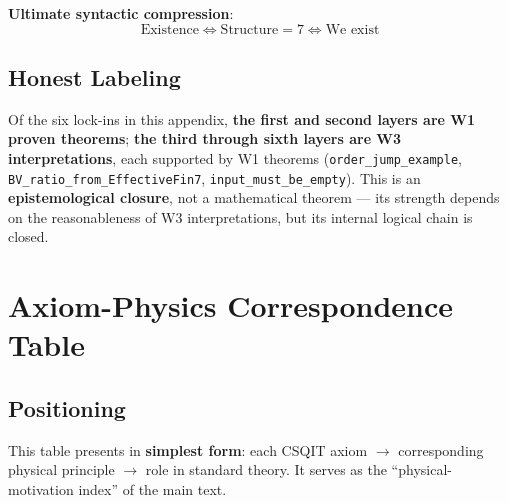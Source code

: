 \documentclass[aps,prd,twocolumn,nofootinbib,floatfix]{revtex4-2}
\begin{document}
\textbf{Ultimate syntactic compression}:
$$ \boxed{\text{Existence} \iff \text{Structure}=7 \iff \text{We exist}} $$

\subsection{Honest Labeling}

Of the six lock-ins in this appendix, \textbf{the first and second layers are W1 proven theorems}; \textbf{the third through sixth layers are W3 interpretations}, each supported by W1 theorems (\texttt{order\_jump\_example}, \texttt{BV\_ratio\_from\_EffectiveFin7}, \texttt{input\_must\_be\_empty}). This is an \textbf{epistemological closure}, not a mathematical theorem --- its strength depends on the reasonableness of W3 interpretations, but its internal logical chain is closed.

\section{Axiom-Physics Correspondence Table}

\subsection{Positioning}

This table presents in \textbf{simplest form}: each CSQIT axiom $\to$ corresponding physical principle $\to$ role in standard theory. It serves as the ``physical-motivation index'' of the main text.
\end{document}
